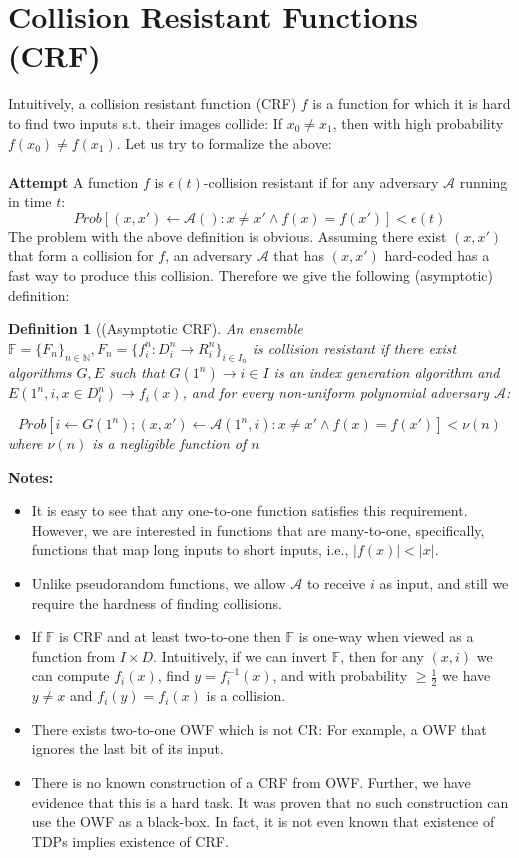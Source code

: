 \documentclass[12pt]{article}
\newcommand{\adv}{\mathcal{A}}
\newcommand{\pr}{Prob}
\newtheorem{definition}{Definition}[section]
\begin{document}
\section{Collision Resistant Functions (CRF)}
Intuitively, a collision resistant function (CRF) $f$ is a function for which it is hard
to find two inputs s.t. their images collide: If $x_0 \neq x_1$, then with high probability $f(x_0) \neq f(x_1)$. Let us try to formalize the above:\\\\
\textbf{Attempt}  A function $f$ is $\epsilon(t)$-collision resistant if for any adversary $\adv$
running in time $t$:
\[ \pr[ (x,x') \leftarrow \adv(): x \neq x' \wedge f(x) = f(x')] < \epsilon(t) \]
The problem with the above definition is obvious. Assuming there exist $(x,x')$ that form a collision for $f$, an adversary $\adv$ that has $(x,x')$ hard-coded has a fast way to produce this collision. Therefore we give the following (asymptotic) definition:\\
\begin{definition}[(Asymptotic CRF] An ensemble $\mathbb{F} = \{F_n\}_{n \in \mathbb{N}}, F_n = \{f^n_i : D^n_i \rightarrow R^n_i\}_{i \in I_n}$ is collision resistant if there exist algorithms $G,E$ such that $G(1^n) \rightarrow i \in I$ is an index generation algorithm and $E(1^n, i, x \in D^n_i ) \rightarrow f_i(x)$, and for every non-uniform polynomial adversary $\adv$:

\[\pr[i \leftarrow G(1^n); (x,x') \leftarrow \adv(1^n,i): x \neq x' \wedge f(x) = f(x')] < \nu(n)\]
where $\nu(n)$ is a negligible function of $n$
\end{definition}
\textbf{Notes:}
\begin{itemize}
\item It is easy to see that any one-to-one function satisfies this requirement. However, we are interested in functions that are many-to-one, specifically, functions that map long inputs to short inputs, i.e., $|f(x)| < |x|$.
\item Unlike pseudorandom functions, we allow $\adv$ to receive $i$ as input, and still we require the hardness of finding collisions.
\item If $\mathbb{F}$ is CRF and at least two-to-one then $\mathbb{F}$ is one-way when viewed as a function from $I \times D$. Intuitively, if we can invert $\mathbb{F}$, then for any $(x,i)$ we can compute $f_i(x)$, find $y= f^{-1}_i(x)$, and with probability $\geq \frac{1}{2}$ we have $y \neq x$ and $f_i(y) = f_i(x)$ is a collision.
\item There exists two-to-one OWF which is not CR: For example, a OWF that ignores the last bit of its input.
\item There is no known construction of a CRF from OWF. Further, we have evidence that this is a hard task. It was proven that no such construction can use the OWF as a black-box. In fact, it is not even known that existence of TDPs implies existence of CRF.
\end{itemize}
\end{document}
